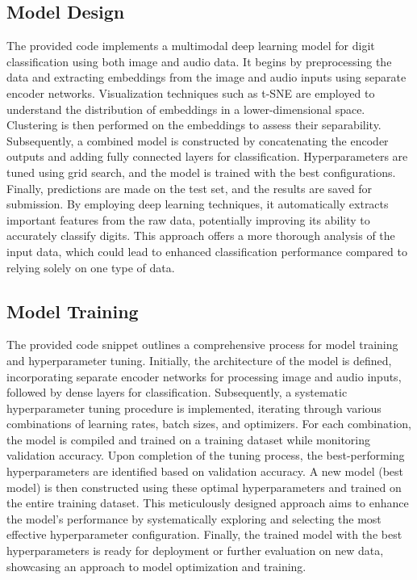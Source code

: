 \documentclass{article}
\begin{document}
\subsection{Model Design}

The provided code implements a multimodal deep learning model for digit classification using both image and audio data. It begins by preprocessing the data and extracting embeddings from the image and audio inputs using separate encoder networks. Visualization techniques such as t-SNE are employed to understand the distribution of embeddings in a lower-dimensional space. Clustering is then performed on the embeddings to assess their separability. Subsequently, a combined model is constructed by concatenating the encoder outputs and adding fully connected layers for classification. Hyperparameters are tuned using grid search, and the model is trained with the best configurations. Finally, predictions are made on the test set, and the results are saved for submission. By employing deep learning techniques, it automatically extracts important features from the raw data, potentially improving its ability to accurately classify digits. This approach offers a more thorough analysis of the input data, which could lead to enhanced classification performance compared to relying solely on one type of data.

\subsection{Model Training}

The provided code snippet outlines a comprehensive process for model training and hyperparameter tuning. Initially, the architecture of the model is defined, incorporating separate encoder networks for processing image and audio inputs, followed by dense layers for classification. Subsequently, a systematic hyperparameter tuning procedure is implemented, iterating through various combinations of learning rates, batch sizes, and optimizers. For each combination, the model is compiled and trained on a training dataset while monitoring validation accuracy. Upon completion of the tuning process, the best-performing hyperparameters are identified based on validation accuracy. A new model (best model) is then constructed using these optimal hyperparameters and trained on the entire training dataset. This meticulously designed approach aims to enhance the model's performance by systematically exploring and selecting the most effective hyperparameter configuration. Finally, the trained model with the best hyperparameters is ready for deployment or further evaluation on new data, showcasing an approach to model optimization and training.
\end{document}
